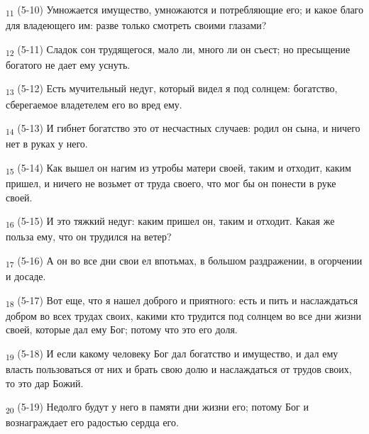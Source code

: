 \begin{tcolorbox}
\textsubscript{11} (5-10) Умножается имущество, умножаются и потребляющие его; и какое благо для владеющего им: разве только смотреть своими глазами?
\end{tcolorbox}
\begin{tcolorbox}
\textsubscript{12} (5-11) Сладок сон трудящегося, мало ли, много ли он съест; но пресыщение богатого не дает ему уснуть.
\end{tcolorbox}
\begin{tcolorbox}
\textsubscript{13} (5-12) Есть мучительный недуг, который видел я под солнцем: богатство, сберегаемое владетелем его во вред ему.
\end{tcolorbox}
\begin{tcolorbox}
\textsubscript{14} (5-13) И гибнет богатство это от несчастных случаев: родил он сына, и ничего нет в руках у него.
\end{tcolorbox}
\begin{tcolorbox}
\textsubscript{15} (5-14) Как вышел он нагим из утробы матери своей, таким и отходит, каким пришел, и ничего не возьмет от труда своего, что мог бы он понести в руке своей.
\end{tcolorbox}
\begin{tcolorbox}
\textsubscript{16} (5-15) И это тяжкий недуг: каким пришел он, таким и отходит. Какая же польза ему, что он трудился на ветер?
\end{tcolorbox}
\begin{tcolorbox}
\textsubscript{17} (5-16) А он во все дни свои ел впотьмах, в большом раздражении, в огорчении и досаде.
\end{tcolorbox}
\begin{tcolorbox}
\textsubscript{18} (5-17) Вот еще, что я нашел доброго и приятного: есть и пить и наслаждаться добром во всех трудах своих, какими кто трудится под солнцем во все дни жизни своей, которые дал ему Бог; потому что это его доля.
\end{tcolorbox}
\begin{tcolorbox}
\textsubscript{19} (5-18) И если какому человеку Бог дал богатство и имущество, и дал ему власть пользоваться от них и брать свою долю и наслаждаться от трудов своих, то это дар Божий.
\end{tcolorbox}
\begin{tcolorbox}
\textsubscript{20} (5-19) Недолго будут у него в памяти дни жизни его; потому Бог и вознаграждает его радостью сердца его.
\end{tcolorbox}
